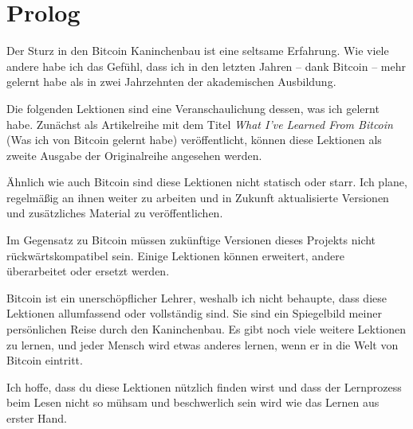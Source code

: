 \chapter*{Prolog}
Der Sturz in den Bitcoin Kaninchenbau ist eine seltsame Erfahrung. Wie viele
andere habe ich das Gefühl, dass ich in den letzten Jahren -- dank Bitcoin --
mehr gelernt habe als in zwei Jahrzehnten der akademischen Ausbildung.

Die folgenden Lektionen sind eine Veranschaulichung dessen, was ich gelernt
habe. Zunächst als Artikelreihe mit dem Titel \textit{What I’ve Learned From
Bitcoin} (Was ich von Bitcoin gelernt habe) veröffentlicht, können diese
Lektionen als zweite Ausgabe der Originalreihe angesehen werden.

Ähnlich wie auch Bitcoin sind diese Lektionen nicht statisch oder starr. Ich
plane, regelmäßig an ihnen weiter zu arbeiten und in Zukunft aktualisierte
Versionen und zusätzliches Material zu veröffentlichen.

Im Gegensatz zu Bitcoin müssen zukünftige Versionen dieses Projekts nicht
rückwärtskompatibel sein. Einige Lektionen können erweitert, andere überarbeitet
oder ersetzt werden.

Bitcoin ist ein unerschöpflicher Lehrer, weshalb ich nicht behaupte, dass diese
Lektionen allumfassend oder vollständig sind. Sie sind ein Spiegelbild meiner
persönlichen Reise durch den Kaninchenbau. Es gibt noch viele weitere Lektionen
zu lernen, und jeder Mensch wird etwas anderes lernen, wenn er in die Welt von
Bitcoin eintritt.

Ich hoffe, dass du diese Lektionen nützlich finden wirst und dass der
Lernprozess beim Lesen nicht so mühsam und beschwerlich sein wird wie das Lernen
aus erster Hand.

%
%
